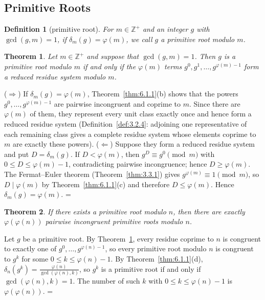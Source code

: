 \documentclass[11pt]{article}
\makeatletter
\let\nt@closedisplay\]
\def\nt@guardedclose{\@ifnextchar\par{\nt@closeafterpar}{\@ifnextchar\end{\postdisplaypenalty\@M\nt@closedisplay}{\nt@closedisplay}}}
\def\nt@closeafterpar\par{\@ifnextchar\par{\nt@closeafterpar}{\@ifnextchar\end{\postdisplaypenalty\@M\nt@closedisplay\par}{\nt@closedisplay\par}}}
\renewenvironment{proof}[1][\proofname]{\par
  \pushQED{\qed}\normalfont\topsep\medskipamount\edef\nt@afterproof{\@endparpenalty=\the\@endparpenalty\relax}\@beginparpenalty\@M\@endparpenalty\@M\let\]\nt@guardedclose\trivlist\item[]\textit{#1\@addpunct{.}} \ignorespaces}{\ifvmode\addpenalty\@M\fi\popQED\nt@afterproof\endtrivlist\@endpefalse}
\theoremstyle{ntstyle}
\newtheorem{theorem}{Theorem}[subsection]
\newtheorem{definition}{Definition}[subsection]
\makeatother
\begin{document}
\subsection{Primitive Roots}

\begin{definition}[primitive root]\label{def:6.2.1}\label{def:primitive-root}
  For $m \in \mathbb{Z}^+$ and an integer $g$ with $\gcd(g, m) = 1$, if $\delta_m(g) = \varphi(m)$, we call $g$ a
  primitive root modulo $m$.

\end{definition}

\begin{theorem}\label{thm:6.2.1} Let $m \in \mathbb{Z}^+$ and
  suppose that $\gcd(g, m) = 1$. Then $g$ is a primitive root modulo $m$ if and only
  if the $\varphi(m)$ terms $g^{0}, g^{1}, \ldots, g^{\varphi(m) - 1}$
  form a reduced residue system modulo $m$.

\end{theorem}

\begin{proof} ($\Rightarrow$) If $\delta_m(g) = \varphi(m)$, Theorem~\ref{thm:6.1.1}(b) shows that the powers $g^{0}, \ldots, g^{\varphi(m) - 1}$ are pairwise incongruent and coprime to $m$. Since there are
  $\varphi(m)$ of them, they represent every unit class exactly once and
  hence form a reduced residue system (Definition~\ref{def:3.2.4}: adjoining one representative of each
  remaining class gives a complete residue system whose elements coprime to $m$ are exactly these powers).
  ($\Leftarrow$) Suppose they form a reduced residue system and put $D = \delta_m(g)$. If $D < \varphi(m)$, then
  $g^{D} \equiv g^{0} \pmod{m}$
  with $0 \le D \le \varphi(m) - 1$, contradicting pairwise
  incongruence; hence $D \ge \varphi(m)$. The Fermat--Euler theorem (Theorem~\ref{thm:3.3.1}) gives
  $g^{\varphi(m)} \equiv 1 \pmod{m}$, so $D \mid \varphi(m)$ by Theorem~\ref{thm:6.1.1}(c) and therefore
  $D \le \varphi(m)$. Hence $\delta_m(g) = \varphi(m)$.
\end{proof}

\begin{theorem}\label{thm:6.2.2} If there exists a primitive root
  modulo $n$, then there are exactly $\varphi(\varphi(n))$ pairwise
  incongruent primitive roots modulo $n$.

\end{theorem}

\begin{proof} Let $g$ be a primitive root. By Theorem~\ref{thm:6.2.1}, every residue coprime to $n$ is congruent to exactly one of
  $g^{0}, \ldots, g^{\varphi(n) - 1}$, so every primitive root modulo
  $n$ is congruent to $g^{k}$ for some $0 \le k \le \varphi(n) - 1$. By
  Theorem~\ref{thm:6.1.1}(d), $\delta_n(g^{k}) = \tfrac{\varphi(n)}{\gcd(\varphi(n), k)}$,
  so $g^{k}$ is a primitive root if and only if $\gcd(\varphi(n), k) = 1$. The number of such $k$ with
  $0 \le k \le \varphi(n) - 1$ is
  $\varphi(\varphi(n))$.
\end{proof}
\end{document}
